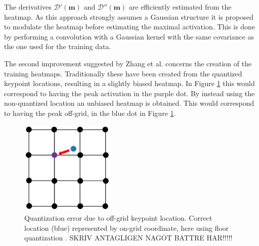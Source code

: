 The derivatives $\mathcal{D'}(\pmb{m})$ and $\mathcal{D''}(\pmb{m})$ are efficiently estimated from the heatmap. As this approach strongly assumes a Gaussian structure it is proposed to modulate the heatmap before estimating the maximal activation. This is done by performing a convolution with a Gaussian kernel with the same covariance as the one used for the training data.

The second improvement suggested by Zhang et al. concerns the creation of the training heatmaps. Traditionally these have been created from the quantized keypoint locations, resulting in a slightly biased heatmap. In Figure \ref{fig:pixel-quantization} this would correspond to having the peak activation in the purple dot. By instead using the non-quantized location an unbiased heatmap is obtained. This would correspond to having the peak off-grid, in the blue dot in Figure \ref{fig:pixel-quantization}.

\begin{figure}
  \centering
  \includegraphics[width=0.4\textwidth]{files/figs/quantization.png}
  \caption{Quantization error due to off-grid keypoint location. Correct location (blue) represented by on-grid coordinate, here using floor quantization \cite{Zhang2020}. SKRIV ANTAGLIGEN NAGOT BATTRE HAR!!!!!}
  \label{fig:pixel-quantization}
\end{figure}

